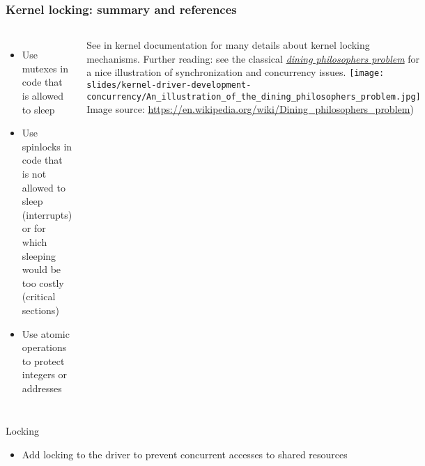 \begin{frame}
  \frametitle{Kernel locking: summary and references}
  \begin{columns}
    \begin{itemize}
    \item Use mutexes in code that is allowed to sleep
    \item Use spinlocks in code that is not allowed to sleep (interrupts)
      or for which sleeping would be too costly (critical sections)
    \item Use atomic operations to protect integers or addresses
    \end{itemize}
    See  in kernel documentation
    for many details about kernel locking mechanisms.
    \footnotesize
    Further reading: see the classical
    {\em \href{https://en.wikipedia.org/wiki/Dining_philosophers_problem}
    {dining philosophers problem}} for a nice illustration of synchronization
    and concurrency issues.
    \texttt{[image: slides/kernel-driver-development-concurrency/An\_illustration\_of\_the\_dining\_philosophers\_problem.jpg]}
    \tiny Image source: \url{https://en.wikipedia.org/wiki/Dining_philosophers_problem})
  \end{columns}
\end{frame}

\setuplabframe
{Locking}
{
  \begin{itemize}
  \item Add locking to the driver to prevent concurrent accesses to
    shared resources
  \end{itemize}
}

